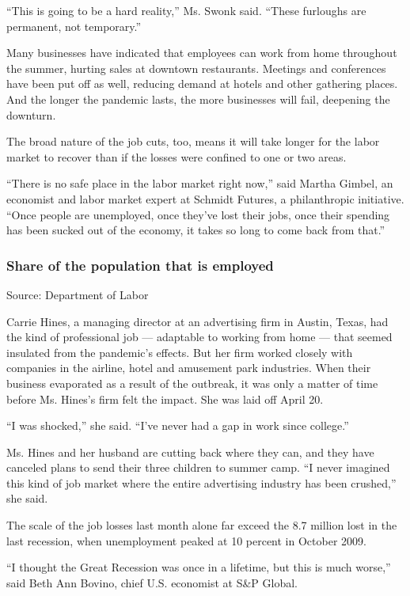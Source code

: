 ``This is going to be a hard reality,'' Ms. Swonk said. ``These
furloughs are permanent, not temporary.''

Many businesses have indicated that employees can work from home
throughout the summer, hurting sales at downtown restaurants. Meetings
and conferences have been put off as well, reducing demand at hotels and
other gathering places. And the longer the pandemic lasts, the more
businesses will fail, deepening the downturn.

The broad nature of the job cuts, too, means it will take longer for the
labor market to recover than if the losses were confined to one or two
areas.

``There is no safe place in the labor market right now,'' said Martha
Gimbel, an economist and labor market expert at Schmidt Futures, a
philanthropic initiative. ``Once people are unemployed, once they've
lost their jobs, once their spending has been sucked out of the economy,
it takes so long to come back from that.''

\hypertarget{share-of-the-population-that-is-employed}{%
\subsubsection{Share of the population that is
employed}\label{share-of-the-population-that-is-employed}}

Source: Department of Labor

Carrie Hines, a managing director at an advertising firm in Austin,
Texas, had the kind of professional job --- adaptable to working from
home --- that seemed insulated from the pandemic's effects. But her firm
worked closely with companies in the airline, hotel and amusement park
industries. When their business evaporated as a result of the outbreak,
it was only a matter of time before Ms. Hines's firm felt the impact.
She was laid off April 20.

``I was shocked,'' she said. ``I've never had a gap in work since
college.''

Ms. Hines and her husband are cutting back where they can, and they have
canceled plans to send their three children to summer camp. ``I never
imagined this kind of job market where the entire advertising industry
has been crushed,'' she said.

The scale of the job losses last month alone far exceed the 8.7 million
lost in the last recession, when unemployment peaked at 10 percent in
October 2009.

``I thought the Great Recession was once in a lifetime, but this is much
worse,'' said Beth Ann Bovino, chief U.S. economist at S\&P Global.


